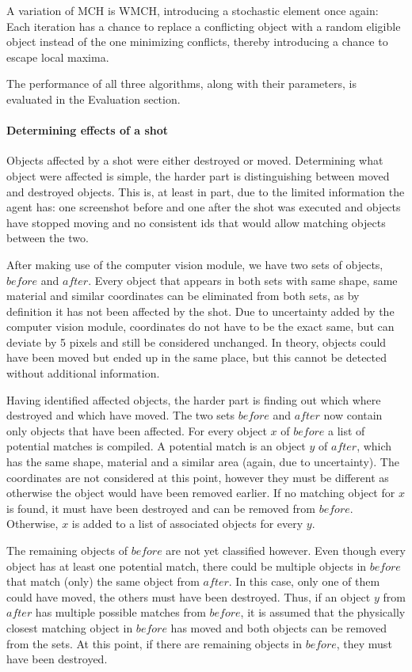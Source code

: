 A variation of MCH is WMCH, introducing a stochastic element once again: Each iteration has a chance to replace a conflicting object with a random eligible object instead of the one minimizing conflicts, thereby introducing a chance to escape local maxima.\cite{KapKis}

The performance of all three algorithms, along with their parameters, is evaluated in the Evaluation section.

\paragraph{Determining effects of a shot}
Objects affected by a shot were either destroyed or moved. Determining what object were affected is simple, the harder part is distinguishing between moved and destroyed objects. This is, at least in part, due to the limited information the agent has: one screenshot before and one after the shot was executed and objects have stopped moving and no consistent ids that would allow matching objects between the two.

After making use of the computer vision module, we have two sets of objects, $before$ and $after$. Every object that appears in both sets with same shape, same material and similar coordinates can be eliminated  from both sets, as by definition it has not been affected by the shot. Due to uncertainty added by the computer vision module, coordinates do not have to be the exact same, but can deviate by 5 pixels and still be considered unchanged. In theory, objects could have been moved but ended up in the same place, but this cannot be detected without additional information.

Having identified affected objects, the harder part is finding out which where destroyed and which have moved. The two sets $before$ and $after$ now contain only objects that have been affected.
For every object $x$ of $before$ a list of potential matches is compiled. A potential match is an object $y$ of $after$, which has the same shape, material and a similar area (again, due to uncertainty). The coordinates are not considered at this point, however they must be different as otherwise the object would have been removed earlier.
If no matching object for $x$ is found, it must have been destroyed and can be removed from $before$. Otherwise, $x$ is added to a list of associated objects for every $y$.

The remaining objects of $before$ are not yet classified however. Even though every object has at least one potential match, there could be multiple objects in $before$ that match (only) the same object from $after$. In this case, only one of them could have moved, the others must have been destroyed. Thus, if an object $y$ from $after$ has multiple possible matches from $before$, it is assumed that the physically closest matching object in $before$ has moved and both objects can be removed from the sets. At this point, if there are remaining objects in $before$, they must have been destroyed.

